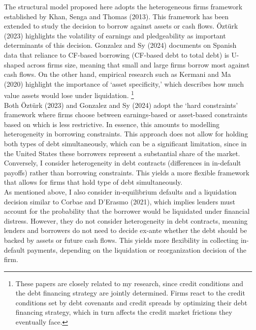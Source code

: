 \documentclass[12pt]{article}
\begin{document}
The structural model proposed here adopts the heterogeneous firms framework established by Khan, Senga and Thomas (2013). This framework has been extended to study the decision to borrow against assets or cash flows. Öztürk (2023) highlights the volatility of earnings and pledgeability as important determinants of this decision. Gonzalez and Sy (2024) documents on Spanish data that reliance to CF-based borrowing (CF-based debt to total debt) is U-shaped across firms size, meaning that small and large firms borrow most against cash flows. On the other hand, empirical research such as Kermani and Ma (2020) highlight the importance of `asset specificity,' which describes how much value assets would lose under liquidation. \footnote{These papers are closely related to my research, since credit conditions and the debt financing strategy are jointly determined. Firms react to the credit conditions set by debt covenants and credit spreads by optimizing their debt financing strategy, which in turn affects the credit market frictions they eventually face.} \vspace{3mm} \\
Both Öztürk (2023) and Gonzalez and Sy (2024) adopt the `hard constraints' framework where firms choose between earnings-based or asset-based constraints based on which is less restrictive. In essence, this amounts to modelling heterogeneity in borrowing constraints. This approach does not allow for holding both types of debt simultaneously, which can be a significant limitation, since in the United States these borrowers represent a substantial share of the market. 
Conversely, I consider heterogeneity in debt contracts (differences in in-default payoffs) rather than borrowing constraints. This yields a more flexible framework that allows for firms that hold type of debt simultaneously. \vspace{3mm} \\
As mentioned above, I also consider in-equilibrium defaults and a liquidation decision similar to Corbae and D'Erasmo (2021), which implies lenders must account for the probability that the borrower would be liquidated under financial distress. However, they do not consider heterogeneity in debt contracts, meaning lenders and borrowers do not need to decide ex-ante whether the debt should be backed by assets or future cash flows. This yields more flexibility in collecting in-default payments, depending on the liquidation or reorganization decision of the firm.  \vspace{3mm} \\
\end{document}
